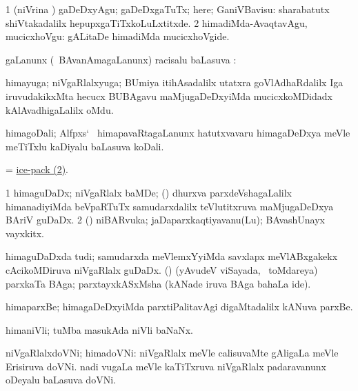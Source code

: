 \noindent
\gl{\akirx}
\bmng
\bnum
\num{1} (niVrina \vi) gaDeDxyAgu; gaDeDxgaTuTx; here; GaniVBavisu:  sharabatutx shiVtakadalilx hepupxgaTiTxkoLuLxtitxde. 
\num{2} himadiMda-AvaqtavAgu, mucicxhoVgu:  gALitaDe himadiMda mucicxhoVgide. 
\enum
\emng
\eentry

\bentry
{}
\gl{\uparx}
\bmng
\nA gaLanunx (\kanmu\ BAvanAmagaLanunx) racisalu baLasuva \uparx:  
\emng
\eentry

\bentry
{}
\gl{\nA}
\bmng
himayuga; niVgaRlalxyuga; BUmiya itihAsadalilx utatxra goVlAdhaRdalilx Iga iruvudakikxMta hecucx BUBAgavu maMjugaDeDxyiMda mucicxkoMDidadx kAlAvadhigaLalilx oMdu. 
\emng
\eentry

\bentry
{}
\gl{\nA}
\bmng
himagoDali; Alfpxs` \mo\ himapavaRtagaLanunx hatutxvavaru himagaDeDxya meVle meTiTxlu kaDiyalu baLasuva koDali.  
\emng
\eentry

\bentry
{}
\gl{\nA}
\bmng
 = \hyperlink{ice-pack(2)}{ice-pack (2)}. 
\emng
\eentry

\bentry
{}
\gl{\nA}
\bmng
\bnum
\num{1} himaguDaDx; niVgaRlalx baMDe; (\sA) dhurxva parxdeVshagaLalilx himanadiyiMda beVpaRTuTx samudarxdalilx teVlutitxruva maMjugaDeDxya BAriV guDaDx.   
\num{2} (\rUpa) niBARvuka; jaDaparxkaqtiyavanu(Lu); BAvashUnayx vayxkitx. 
\enum
\emng

\noindent
\gl{\pagu}
\bmng
{} 
\banum
{} himaguDaDxda tudi; samudarxda meVlemxYyiMda savxlapx meVlABxgakekx cAcikoMDiruva niVgaRlalx guDaDx. 
 (\rUpa) (yAvudeV viSayada, \kanmu\ toMdareya) parxkaTa BAga; parxtayxkASxMsha (kANade iruva BAga bahaLa ide). 
\eanum
\emng
\eentry

\bentry
{}
\gl{\nA}
\bmng
himaparxBe; himagaDeDxyiMda parxtiPalitavAgi digaMtadalilx kANuva parxBe. 
\emng
\eentry

\bentry
{}
\gl{\nA}
\bmng
himaniVli; tuMba masukAda niVli baNaNx. 
\emng
\eentry

\bentry
{}
\gl{\nA}
\bmng
niVgaRlalxdoVNi; himadoVNi: 
\banum
{} niVgaRlalx meVle calisuvaMte gAligaLa meVle Erisiruva doVNi. 
\hypertarget{ice-boat(b)}{} 
 nadi \mo vugaLa meVle kaTiTxruva niVgaRlalx padaravanunx oDeyalu baLasuva doVNi. 
\eanum
\emng
\eentry

